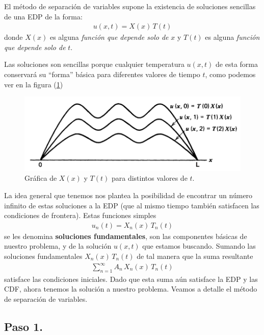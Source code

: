 El método de separación de variables supone la existencia de soluciones sencillas de una EDP de la forma:
\begin{align*}
u(x, t) =  X(x) \, T(t)
\end{align*}
donde $X (x)$ es alguna \emph{función que depende solo de} $x$ y $T (t)$ es alguna \emph{función que depende solo de} $t$.
\par
Las soluciones son sencillas porque cualquier temperatura $u (x, t)$ de esta forma conservará su \enquote{forma} básica para diferentes valores de tiempo $t$, como podemos ver en la figura (\ref{fig:figura_separacion_variables_01})
\begin{figure}[H]
    \centering
    \includegraphics[scale=0.4]{Imagenes/Separacion_Variables_01.png}
    \caption{Gráfica de $X(x)$ y $T(t)$ para distintos valores de $t$.}
    \label{fig:figura_separacion_variables_01}
\end{figure}
La idea general que tenemos nos plantea la posibilidad de encontrar un número infinito de estas soluciones a la EDP (que al mismo tiempo también satisfacen las condiciones de frontera). Estas funciones simples
\begin{align*}
u_{n} (t) = X_{n} (x) \, T_{n}(t)
\end{align*}
se les denomina \textbf{soluciones fundamentales}, son las componentes básicas de nuestro problema, y de la solución $u (x, t)$ que estamos buscando. Sumando las soluciones fundamentales $X_{n}(x) \, T_{n} (t)$ de tal manera que la suma resultante
\begin{align*}
\sum_{n=1}^{\infty} A_{n} \, X_{n} (x) \, T_{n} (t)
\end{align*}
satisface las condiciones iniciales. Dado que esta suma aún satisface la EDP y las CDF, ahora tenemos la solución a nuestro problema. Veamos a detalle el método de separación de variables.

\subsection{Paso 1.}

